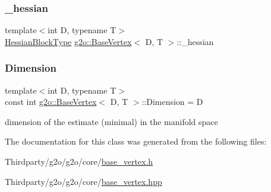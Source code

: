 \mbox{\label{classg2o_1_1_base_vertex_afaf73b0e874db76655d90bdb2f156c00}} 
\subsubsection{\texorpdfstring{\+\_\+hessian}{\_hessian}}
{\footnotesize\ttfamily template$<$int D, typename T$>$ \\
\mbox{\hyperlink{classg2o_1_1_base_vertex_a887928bc60710e0ec9acb269ee7411db}{Hessian\+Block\+Type}} \mbox{\hyperlink{classg2o_1_1_base_vertex}{g2o\+::\+Base\+Vertex}}$<$ D, T $>$\+::\+\_\+hessian\hspace{0.3cm}{\ttfamily [protected]}}

\mbox{\label{classg2o_1_1_base_vertex_a9a831bfdf84cfe625d8f942bc4f1c2d1}} 
\subsubsection{\texorpdfstring{Dimension}{Dimension}}
{\footnotesize\ttfamily template$<$int D, typename T$>$ \\
const int \mbox{\hyperlink{classg2o_1_1_base_vertex}{g2o\+::\+Base\+Vertex}}$<$ D, T $>$\+::Dimension = D\hspace{0.3cm}{\ttfamily [static]}}



dimension of the estimate (minimal) in the manifold space 



The documentation for this class was generated from the following files\+:\begin{DoxyCompactItemize}
\item 
Thirdparty/g2o/g2o/core/\mbox{\hyperlink{base__vertex_8h}{base\+\_\+vertex.\+h}}\item 
Thirdparty/g2o/g2o/core/\mbox{\hyperlink{base__vertex_8hpp}{base\+\_\+vertex.\+hpp}}\end{DoxyCompactItemize}
